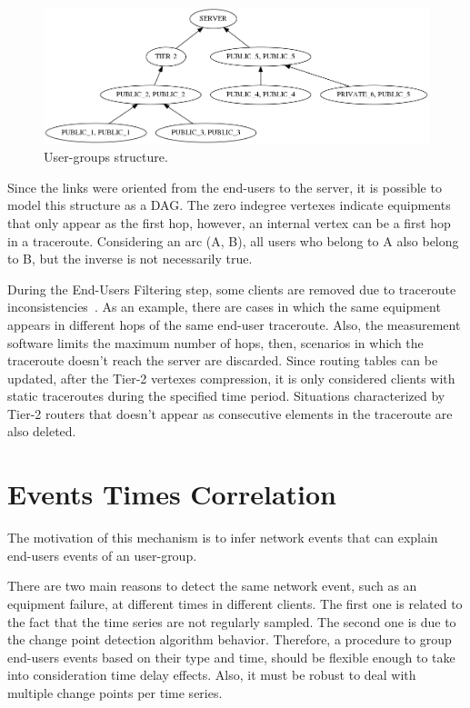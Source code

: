 \begin{figure}[H]
    \centering
    \includegraphics[width=\linewidth]{./figures/methodology/spatial_correlation/dtstart2016-05-01_dtend2016-05-11_NRIDTCLDM031_graph_anonymized.png}
    \caption{User-groups structure.}
\label{fig:real_graph}
\end{figure}%

Since the links were oriented from the end-users to the server,
it is possible to model this structure as a DAG\@. The zero
indegree vertexes indicate equipments that only appear as the first hop,
however, an internal vertex can be a first hop in a traceroute.
Considering an arc (A, B), all users who belong to A also belong to B,
but the inverse is not necessarily true.

During the End-Users Filtering step, some clients are removed due to traceroute
inconsistencies~\cite{avoiding_traceroute_anomalies_with_paris_traceroute}.
As an example, there are cases in which the same equipment appears in different
hops of the same end-user traceroute. Also,
the measurement software limits the maximum number of hops, then,
scenarios in which the traceroute doesn't reach the server are discarded.
Since routing tables can be updated, after the Tier-2 vertexes compression,
it is only considered clients with static traceroutes
during the specified time period.
Situations characterized by Tier-2 routers that doesn't appear as consecutive
elements in the traceroute are also deleted.

\section{Events Times Correlation}
\label{sec:events_times_correlation}

The motivation of this mechanism is to infer network events that can explain
end-users events of an user-group.

There are two main reasons to detect the same network event, such as an
equipment failure, at different times in different clients. The first one is
related to the fact that the time series are not regularly sampled. The second
one is due to the change point detection algorithm behavior.
Therefore, a procedure to group end-users events based on their type and time,
should be flexible enough to take into consideration time delay effects. Also,
it must be robust to deal with multiple change points per time series.

